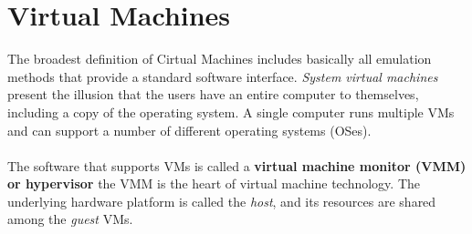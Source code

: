 \documentclass[letterpaper,c12pt]{article}
\begin{document}
\section{Virtual Machines}
The broadest definition of Cirtual Machines includes basically all emulation methods that provide a standard software interface. \textit{System virtual machines} present the illusion that the users have an entire computer to themselves, including a copy of the operating system. A single computer runs multiple VMs and can support a number of different operating systems (OSes).\\\\
The software that supports VMs is called a \textbf{virtual machine monitor (VMM) or hypervisor} the VMM is the heart of virtual machine technology. The underlying hardware platform is called the \textit{host}, and its resources are shared among the \textit{guest} VMs.
\end{document}
